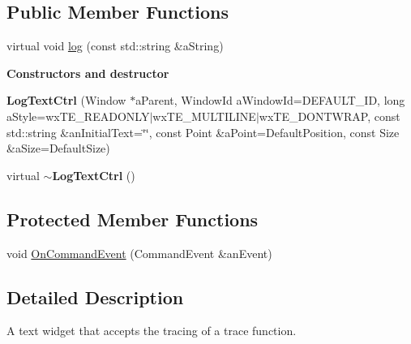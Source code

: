 \subsection*{Public Member Functions}
\begin{DoxyCompactItemize}
\item 
virtual void \hyperlink{class_application_1_1_log_text_ctrl_aecf20eb2fc19af8632542de0166a050e}{log} (const std\+::string \&a\+String)
\end{DoxyCompactItemize}
\begin{Indent}{\bf Constructors and destructor}\par
\begin{DoxyCompactItemize}
\item 
{\bfseries Log\+Text\+Ctrl} (Window $\ast$a\+Parent, Window\+Id a\+Window\+Id=D\+E\+F\+A\+U\+L\+T\+\_\+\+ID, long a\+Style=wx\+T\+E\+\_\+\+R\+E\+A\+D\+O\+N\+LY$\vert$wx\+T\+E\+\_\+\+M\+U\+L\+T\+I\+L\+I\+NE$\vert$wx\+T\+E\+\_\+\+D\+O\+N\+T\+W\+R\+AP, const std\+::string \&an\+Initial\+Text=\char`\"{}\char`\"{}, const Point \&a\+Point=Default\+Position, const Size \&a\+Size=Default\+Size)\hypertarget{class_application_1_1_log_text_ctrl_aded0f03a723158ab1a3d2de74a3c8262}{}\label{class_application_1_1_log_text_ctrl_aded0f03a723158ab1a3d2de74a3c8262}

\item 
virtual {\bfseries $\sim$\+Log\+Text\+Ctrl} ()\hypertarget{class_application_1_1_log_text_ctrl_a02828be6cb16c6c772f881757f61c7af}{}\label{class_application_1_1_log_text_ctrl_a02828be6cb16c6c772f881757f61c7af}

\end{DoxyCompactItemize}
\end{Indent}
\subsection*{Protected Member Functions}
\begin{DoxyCompactItemize}
\item 
void \hyperlink{class_application_1_1_log_text_ctrl_af03d3d9049d7a9c13de10d249751fc5e}{On\+Command\+Event} (Command\+Event \&an\+Event)
\end{DoxyCompactItemize}


\subsection{Detailed Description}
A text widget that accepts the tracing of a trace function. 

